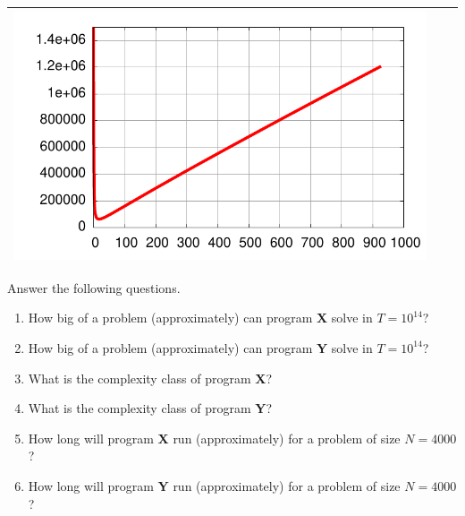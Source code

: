 \documentclass[a4paper]{article}
\newcounter{question}
\begin{document}
\begin{center}
\begin{tabular}{|l|c|c|}
    \includegraphics[width=0.44\columnwidth]{on2_nln.pdf} \\
    \hline
  \end{tabular}
\end{center}

\vfill

\noindent
Answer the following questions.

\begin{enumerate}
\item
  How big of a problem (approximately) can program \textbf{X} solve in $T=10^{14}$?
\item
  How big of a problem (approximately) can program \textbf{Y} solve in $T=10^{14}$?
\item
  What is the complexity class of program \textbf{X}?
\item
  What is the complexity class of program \textbf{Y}?
\item
  How long will program \textbf{X} run (approximately) for a problem of size $N=4000$?
\item
  How long will program \textbf{Y} run (approximately) for a problem of size $N=4000$?
\end{enumerate}
\end{document}
